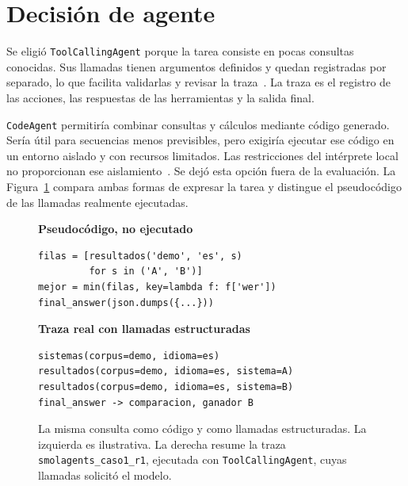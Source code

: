 \section{Decisión de agente}

Se eligió \texttt{ToolCallingAgent} porque la tarea consiste en pocas consultas conocidas. Sus llamadas tienen argumentos definidos y quedan registradas por separado, lo que facilita validarlas y revisar la traza~\cite{smolagentsTour,smolagentsSec}. La traza es el registro de las acciones, las respuestas de las herramientas y la salida final.

\texttt{CodeAgent} permitiría combinar consultas y cálculos mediante código generado. Sería útil para secuencias menos previsibles, pero exigiría ejecutar ese código en un entorno aislado y con recursos limitados. Las restricciones del intérprete local no proporcionan ese aislamiento~\cite{smolagentsSec}. Se dejó esta opción fuera de la evaluación. La Figura~\ref{fig:acciones} compara ambas formas de expresar la tarea y distingue el pseudocódigo de las llamadas realmente ejecutadas.

\begin{figure}[htbp]
\centering
\begin{minipage}[t]{0.47\textwidth}
\footnotesize\textbf{Pseudocódigo, no ejecutado}
\begin{verbatim}
filas = [resultados('demo', 'es', s)
         for s in ('A', 'B')]
mejor = min(filas, key=lambda f: f['wer'])
final_answer(json.dumps({...}))
\end{verbatim}
\end{minipage}\hfill
\begin{minipage}[t]{0.5\textwidth}
\footnotesize\textbf{Traza real con llamadas estructuradas}
\begin{verbatim}
sistemas(corpus=demo, idioma=es)
resultados(corpus=demo, idioma=es, sistema=A)
resultados(corpus=demo, idioma=es, sistema=B)
final_answer -> comparacion, ganador B
\end{verbatim}
\end{minipage}
\caption{La misma consulta como código y como llamadas estructuradas. La izquierda es ilustrativa. La derecha resume la traza \texttt{smolagents\_caso1\_r1}, ejecutada con \texttt{ToolCallingAgent}, cuyas llamadas solicitó el modelo.}
\label{fig:acciones}
\end{figure}
